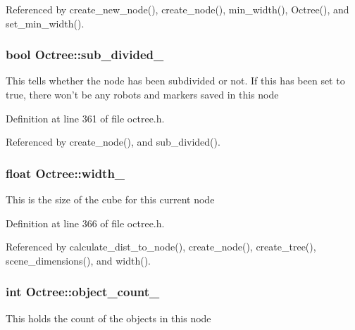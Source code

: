 Referenced by create\_\-new\_\-node(), create\_\-node(), min\_\-width(), Octree(), and set\_\-min\_\-width().\hypertarget{class_octree_1ff3eebef24edecea4359fdaa994d26d}{
\subsubsection[sub\_\-divided\_\-]{\setlength{\rightskip}{0pt plus 5cm}bool {\bf Octree::sub\_\-divided\_\-}}}
\label{class_octree_1ff3eebef24edecea4359fdaa994d26d}


This tells whether the node has been subdivided or not. If this has been set to true, there won't be any robots and markers saved in this node 

Definition at line 361 of file octree.h.

Referenced by create\_\-node(), and sub\_\-divided().\hypertarget{class_octree_8f8660a65257ea4368c6ba2e57df86fc}{
\subsubsection[width\_\-]{\setlength{\rightskip}{0pt plus 5cm}float {\bf Octree::width\_\-}}}
\label{class_octree_8f8660a65257ea4368c6ba2e57df86fc}


This is the size of the cube for this current node 

Definition at line 366 of file octree.h.

Referenced by calculate\_\-dist\_\-to\_\-node(), create\_\-node(), create\_\-tree(), scene\_\-dimensions(), and width().\hypertarget{class_octree_0faf7b0d6e445aee6e6954d4efdafcf9}{
\subsubsection[object\_\-count\_\-]{\setlength{\rightskip}{0pt plus 5cm}int {\bf Octree::object\_\-count\_\-}}}
\label{class_octree_0faf7b0d6e445aee6e6954d4efdafcf9}


This holds the count of the objects in this node 

